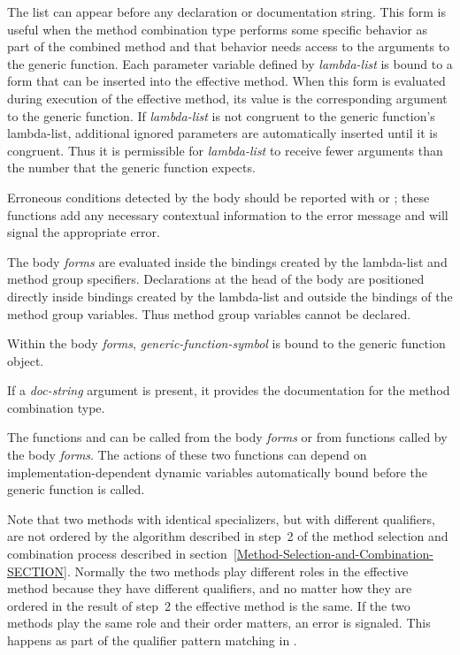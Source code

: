 \begin{defmac}
The list  can appear before
any declaration or documentation string.  This form is useful when
the method combination type performs some specific behavior as part of
the combined method and that behavior needs access to the arguments to
the generic function.  Each parameter variable defined by \emph{lambda-list\/}
is bound to a form that can be inserted into the effective method.  When this
form is evaluated during execution of the 
effective method, its value is the corresponding argument to the
generic function.  If \emph{lambda-list\/} is not congruent to the
generic function's lambda-list, additional ignored parameters are
automatic\-ally inserted until it is congruent.  Thus it is permissible
for \emph{lambda-list\/} to receive fewer arguments than the number
that the generic function expects.
 
Erroneous conditions detected by the body should be reported with
 or
; these functions
add any necessary contextual information to the error message and will
signal the appropriate error.

The body \emph{forms\/} are evaluated inside the bindings created by the
lambda-list and method group specifiers.  Declarations at the head of
the body are positioned directly inside bindings created by the
lambda-list and outside the bindings of the method group variables. 
Thus method group variables cannot be declared.

Within the body \emph{forms\/}, \emph{generic-function-symbol}
is bound to the generic function object.

If a \emph{doc-string\/} argument is present, it provides the
documentation for the method combination type.

The functions  and 
 can be called from the body \emph{forms\/} or
from functions called by the body \emph{forms\/}.  The actions of these
two functions can depend on implementation-dependent dynamic variables
automatically bound before the generic function 
 is called.

Note that two methods with identical specializers, but with different
qualifiers, are not ordered by the algorithm described in step~2 of
the method selection and combination process described in
section~\ref{Method-Selection-and-Combination-SECTION}.
Normally the two methods play
different roles in the effective method because they have different
qualifiers, and no matter how they are ordered in the result of step~2
the effective method is the same.  If the two methods play the same
role and their order matters, an error is signaled.  This happens as
part of the qualifier pattern matching in 
.


\end{defmac}
